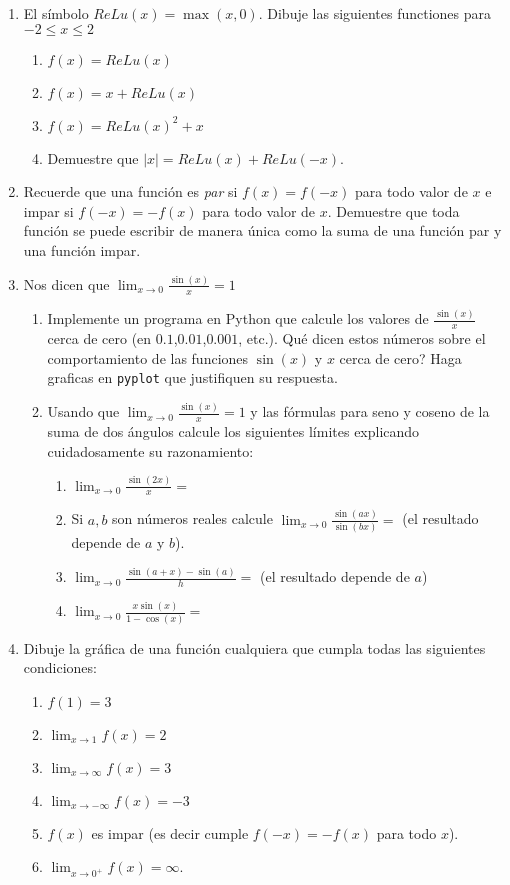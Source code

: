 \documentclass[12pt, a4paper]{article}
\begin{document}
\begin{enumerate}
\item El símbolo $ReLu(x)=\max(x,0)$. Dibuje las siguientes functiones para $-2\leq x\leq 2$
\begin{enumerate}
\item $f(x)=ReLu(x)$
\item $f(x)=x+ReLu(x)$
\item $f(x)=ReLu(x)^2+x$
\item Demuestre que $|x|=ReLu(x)+ReLu(-x)$.
\end{enumerate}

\item Recuerde que una función es \emph{par} si $f(x)=f(-x)$ para todo valor de $x$ e impar si $f(-x)=-f(x)$ para todo valor de $x$. Demuestre que toda función se puede escribir de manera única como la suma de una función par y una función impar.


\item Nos dicen que $\lim_{x\rightarrow 0}\frac{\sin(x)}{x}=1$ 
\begin{enumerate}
\item Implemente un programa en Python que calcule los valores de $\frac{\sin(x)}{x}$ cerca de cero (en $0.1$,$0.01$,$0.001$, etc.). Qué dicen estos números sobre el comportamiento de las funciones $\sin(x)$ y $x$ cerca de cero? Haga graficas en \verb!pyplot! que justifiquen su respuesta.

\item Usando que $\lim_{x\rightarrow 0}\frac{\sin(x)}{x}=1$ y las fórmulas para seno y coseno de la suma de dos ángulos calcule los siguientes límites explicando cuidadosamente su razonamiento:

\begin{enumerate}
\item $\lim_{x\rightarrow 0} \frac{\sin(2x)}{x}=$ 
\item Si $a,b$ son números reales calcule $\lim_{x\rightarrow 0} \frac{\sin(ax)}{\sin(bx)}=$ (el resultado depende de $a$ y $b$).
\item $\lim_{x\rightarrow 0} \frac{\sin(a+x)-\sin(a)}{h}=$ (el resultado depende de $a$) 
\item $\lim_{x\rightarrow 0} \frac{x\sin(x)}{1-\cos(x)}=$

\end{enumerate}

\end{enumerate}



\item Dibuje la gráfica de una función cualquiera que cumpla todas las siguientes condiciones:
\begin{enumerate}
\item $f(1)=3$
\item $\lim_{x\rightarrow 1} f(x)=2$
\item $\lim_{x\rightarrow \infty} f(x)=3$
\item $\lim_{x\rightarrow -\infty} f(x)=-3$
\item $f(x)$ es impar (es decir cumple $f(-x)=-f(x)$ para todo $x$).
\item $\lim_{x\rightarrow 0^{+}} f(x)=\infty$.
\end{enumerate}


\end{enumerate}
\end{document}
